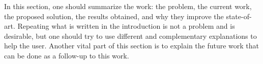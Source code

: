 In this section, one should summarize the work: the problem, the current work,
the proposed solution, the results obtained, and why they improve the
state-of-art. Repeating what is written in the introduction is not a problem and
is desirable, but one should try to use different and complementary explanations
to help the user. Another vital part of this section is to explain the future
work that can be done as a follow-up to this work.
